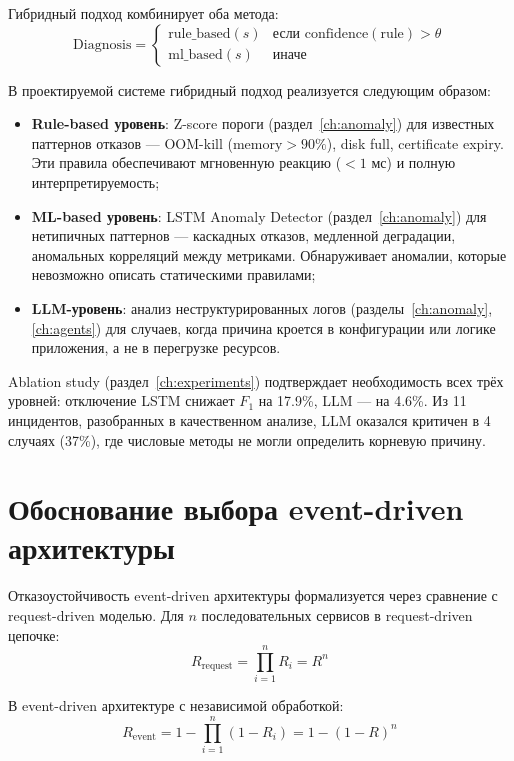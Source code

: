 Гибридный подход комбинирует оба метода:
\begin{equation}
\text{Diagnosis} = \begin{cases}
\text{rule\_based}(s) & \text{если } \text{confidence}(\text{rule}) > \theta \\
\text{ml\_based}(s) & \text{иначе}
\end{cases}
\label{eq:hybrid_diagnosis_paradigm}
\end{equation}

В проектируемой системе гибридный подход реализуется следующим образом:
\begin{itemize}
    \item \textbf{Rule-based уровень}: Z-score пороги (раздел~\ref{ch:anomaly}) для известных паттернов отказов --- OOM-kill ($\text{memory} > 90\%$), disk full, certificate expiry. Эти правила обеспечивают мгновенную реакцию ($< 1$ мс) и полную интерпретируемость;
    \item \textbf{ML-based уровень}: LSTM Anomaly Detector (раздел~\ref{ch:anomaly}) для нетипичных паттернов --- каскадных отказов, медленной деградации, аномальных корреляций между метриками. Обнаруживает аномалии, которые невозможно описать статическими правилами;
    \item \textbf{LLM-уровень}: анализ неструктурированных логов (разделы~\ref{ch:anomaly}, \ref{ch:agents}) для случаев, когда причина кроется в конфигурации или логике приложения, а не в перегрузке ресурсов.
\end{itemize}

Ablation study (раздел~\ref{ch:experiments}) подтверждает необходимость всех трёх уровней: отключение LSTM снижает $F_1$ на 17.9\%, LLM --- на 4.6\%. Из 11 инцидентов, разобранных в качественном анализе, LLM оказался критичен в 4 случаях (37\%), где числовые методы не могли определить корневую причину.

\section{Обоснование выбора event-driven архитектуры}

Отказоустойчивость event-driven архитектуры формализуется через сравнение с request-driven моделью. Для $n$ последовательных сервисов в request-driven цепочке:
\begin{equation}
R_{\text{request}} = \prod_{i=1}^{n} R_i = R^n
\label{eq:request_resilience_paradigm}
\end{equation}

В event-driven архитектуре с независимой обработкой:
\begin{equation}
R_{\text{event}} = 1 - \prod_{i=1}^{n}(1 - R_i) = 1 - (1 - R)^n
\label{eq:event_resilience_paradigm}
\end{equation}

